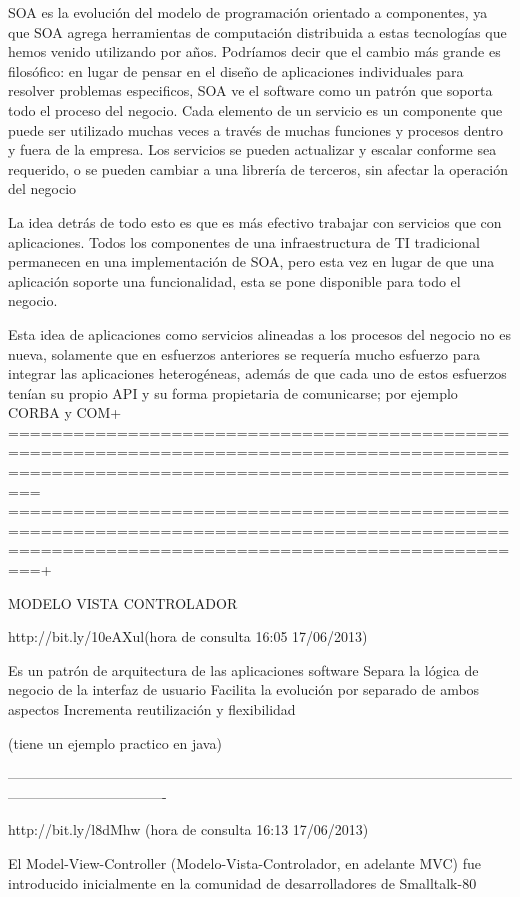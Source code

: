 SOA es la evolución del modelo de programación orientado a componentes, ya que SOA agrega herramientas de computación distribuida a 
estas tecnologías que hemos venido utilizando por años. Podríamos decir que el cambio más grande es filosófico: en lugar de pensar en 
el diseño de aplicaciones individuales para resolver problemas especificos, SOA ve el software como un patrón que soporta todo el proceso 
del negocio. Cada elemento de un servicio es un componente que puede ser utilizado muchas veces a través de muchas funciones y procesos 
dentro y fuera de la empresa. Los servicios se pueden actualizar y escalar conforme sea requerido, o se pueden cambiar a una librería de 
terceros, sin afectar la operación del negocio

La idea detrás de todo esto es que es más efectivo trabajar con servicios que con aplicaciones. Todos los componentes de una
infraestructura de TI tradicional permanecen en una implementación de SOA, pero esta vez en lugar de que una aplicación soporte una
funcionalidad, esta se pone disponible para todo el negocio.

Esta idea de aplicaciones como servicios alineadas a los procesos del negocio no es nueva, solamente que en esfuerzos anteriores se 
requería mucho esfuerzo para integrar las aplicaciones heterogéneas, además de que cada uno de estos esfuerzos tenían su propio API y 
su forma propietaria de comunicarse; por ejemplo CORBA y COM+
=============================================================================================================================================
=============================================================================================================================================+

MODELO VISTA CONTROLADOR

http://bit.ly/10eAXul(hora de consulta 16:05 17/06/2013)

Es un patrón de arquitectura de las aplicaciones software
Separa la lógica de negocio de la interfaz de usuario
Facilita la evolución por separado de ambos aspectos
Incrementa reutilización y flexibilidad

(tiene un ejemplo practico en java)

----------------------------------------------------------------------------------------------------------------------------------------------

http://bit.ly/l8dMhw (hora de consulta 16:13 17/06/2013)


El Model-View-Controller (Modelo-Vista-Controlador, en adelante MVC) fue introducido inicialmente en la comunidad de desarrolladores
de Smalltalk-80


